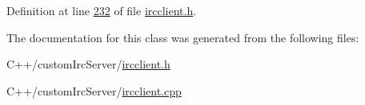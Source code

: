 Definition at line \hyperlink{ircclient_8h_source_l00232}{232} of file \hyperlink{ircclient_8h_source}{ircclient.\-h}.



The documentation for this class was generated from the following files\-:\begin{DoxyCompactItemize}
\item 
C++/custom\-Irc\-Server/\hyperlink{ircclient_8h}{ircclient.\-h}\item 
C++/custom\-Irc\-Server/\hyperlink{ircclient_8cpp}{ircclient.\-cpp}\end{DoxyCompactItemize}
